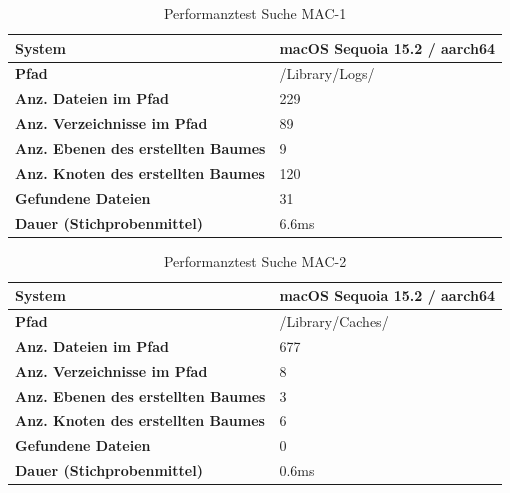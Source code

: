 \documentclass[a4paper,12pt]{report}
\begin{document}
    \begin{table}[h!]
        \centering
        \setlength{\leftmargini}{0.8cm}
        \begin{tabular}{|p{7cm}|p{5cm}|}
            \hline
            \textbf{System}                                     & macOS Sequoia 15.2 / aarch64 \\ \hline
            \textbf{Pfad}                                       & /Library/Logs/               \\ \hline
            \textbf{Anz. Dateien im Pfad}                       & 229                          \\ \hline
            \textbf{Anz. Verzeichnisse im Pfad}                 & 89                           \\ \hline
            \textbf{Anz. Ebenen \newline des erstellten Baumes} & 9                            \\ \hline
            \textbf{Anz. Knoten \newline des erstellten Baumes} & 120                          \\ \hline
            \textbf{Gefundene Dateien}                          & 31                           \\ \hline
            \textbf{Dauer (Stichprobenmittel)}                  & 6.6ms                        \\ \hline
        \end{tabular}
        \caption{Performanztest Suche MAC-1}\label{tab:perf-search-mac-1}
    \end{table}

    \begin{table}[h!]
        \centering
        \setlength{\leftmargini}{0.8cm}
        \begin{tabular}{|p{7cm}|p{5cm}|}
            \hline
            \textbf{System}                                     & macOS Sequoia 15.2 / aarch64 \\ \hline
            \textbf{Pfad}                                       & /Library/Caches/             \\ \hline
            \textbf{Anz. Dateien im Pfad}                       & 677                          \\ \hline
            \textbf{Anz. Verzeichnisse im Pfad}                 & 8                            \\ \hline
            \textbf{Anz. Ebenen \newline des erstellten Baumes} & 3                            \\ \hline
            \textbf{Anz. Knoten \newline des erstellten Baumes} & 6                            \\ \hline
            \textbf{Gefundene Dateien}                          & 0                            \\ \hline
            \textbf{Dauer (Stichprobenmittel)}                  & 0.6ms                        \\ \hline
        \end{tabular}
        \caption{Performanztest Suche MAC-2}\label{tab:perf-search-mac-2}
    \end{table}
\end{document}

